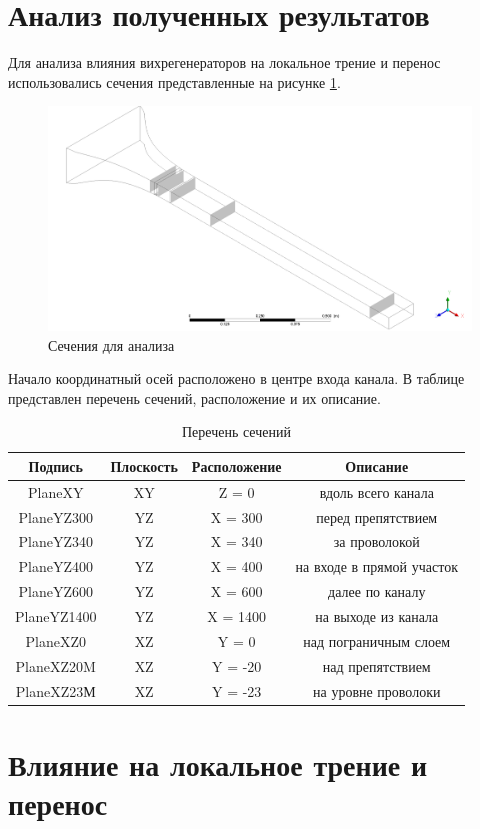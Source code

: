 \section{Анализ полученных результатов}
	
	Для анализа влияния вихрегенераторов на локальное трение и перенос использовались сечения представленные на рисунке \ref{fig:planesforanalysis}. 
	\begin{figure}[H]
		\centering
		\includegraphics[width=0.9\linewidth]{../Assets/1}
		\caption{Сечения для анализа}
		\label{fig:planesforanalysis}
	\end{figure}
	
	Начало координатный осей расположено в центре входа канала. В таблице представлен перечень сечений, расположение и их описание. %
	\begin{table}[H]
		\begin{center}
			\begin{tabular}{|c|c|c|c|}
				\hline
				Подпись & Плоскость & Расположение & Описание\\
				\hline
				PlaneXY & XY & Z = 0 & вдоль всего канала\\
				\hline
				PlaneYZ300 & YZ & X = 300 & перед препятствием\\
				\hline
				PlaneYZ340 & YZ & X = 340 & за проволокой\\
				\hline
				PlaneYZ400 & YZ & X = 400 & на входе в прямой участок\\
				\hline
				PlaneYZ600 & YZ & X = 600 & далее по каналу\\
				\hline
				PlaneYZ1400 & YZ & X = 1400 & на выходе из канала\\
				\hline
				PlaneXZ0 & XZ & Y = 0 & над пограничным слоем\\
				\hline
				PlaneXZ20M & XZ & Y = -20 & над препятствием\\
				\hline
				PlaneXZ23М & XZ & Y = -23 & на уровне проволоки\\
				\hline
			\end{tabular}
		\end{center}
		\caption{Перечень сечений}
	\end{table}

\section{Влияние на локальное трение и перенос}
